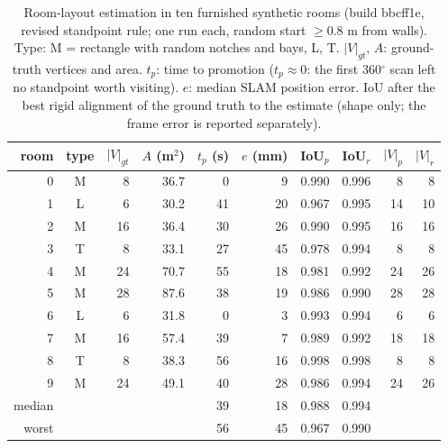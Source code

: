\begin{table}[t]
\centering
\caption{Room-layout estimation in ten furnished synthetic rooms (build bbcff1e, revised standpoint rule; one run each, random start $\geq$0.8 m from walls). Type: M = rectangle with random notches and bays, L, T. $|V|_{gt}$, $A$: ground-truth vertices and area. $t_p$: time to promotion ($t_p\approx0$: the first 360$^\circ$ scan left no standpoint worth visiting). $e$: median SLAM position error. IoU after the best rigid alignment of the ground truth to the estimate (shape only; the frame error is reported separately).}
\label{tab:estimation-synthetic-furnished-bbcff1e}
\begin{tabular}{r c r r r r r r r r}
\toprule
room & type & $|V|_{gt}$ & $A$ (m$^2$) & $t_p$ (s) & $e$ (mm) & IoU$_p$ & IoU$_r$ & $|V|_p$ & $|V|_r$ \\
\midrule
0 & M & 8 & 36.7 & 0 & 9 & 0.990 & 0.996 & 8 & 8 \\
1 & L & 6 & 30.2 & 41 & 20 & 0.967 & 0.995 & 14 & 10 \\
2 & M & 16 & 36.4 & 30 & 26 & 0.990 & 0.995 & 16 & 16 \\
3 & T & 8 & 33.1 & 27 & 45 & 0.978 & 0.994 & 8 & 8 \\
4 & M & 24 & 70.7 & 55 & 18 & 0.981 & 0.992 & 24 & 26 \\
5 & M & 28 & 87.6 & 38 & 19 & 0.986 & 0.990 & 28 & 28 \\
6 & L & 6 & 31.8 & 0 & 3 & 0.993 & 0.994 & 6 & 6 \\
7 & M & 16 & 57.4 & 39 & 7 & 0.989 & 0.992 & 18 & 18 \\
8 & T & 8 & 38.3 & 56 & 16 & 0.998 & 0.998 & 8 & 8 \\
9 & M & 24 & 49.1 & 40 & 28 & 0.986 & 0.994 & 24 & 26 \\
\midrule
median & & & & 39 & 18 & 0.988 & 0.994 & & \\
worst & & & & 56 & 45 & 0.967 & 0.990 & & \\
\bottomrule
\end{tabular}
\end{table}
